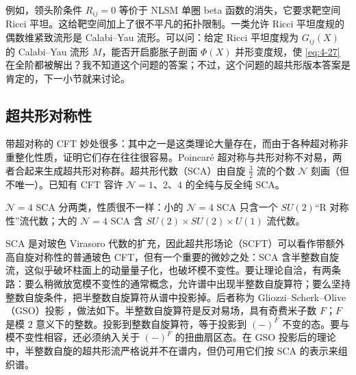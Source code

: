 
例如，领头阶条件 $R_{ij}=0$ 等价于 NLSM 单圈 beta 函数的消失，它要求靶空间 Ricci 平坦。这给靶空间加上了很不平凡的拓扑限制。一类允许 Ricci 平坦度规的偶数维紧致流形是 Calabi--Yau 流形。可以问：给定 Ricci 平坦度规为 $G_{ij}(X)$ 的 Calabi--Yau 流形 $M$，能否开启膨胀子剖面 $\Phi(X)$ 并形变度规，使 \eqref{eq:4-27} 在全阶都被解出？我不知道这个问题的答案；不过，这个问题的超共形版本答案是肯定的，下一小节就来讨论。


\subsection{超共形对称性}

带超对称的 CFT 妙处很多：其中之一是这类理论大量存在，而由于各种超对称非重整化性质，证明它们存在往往很容易。Poincaré 超对称与共形对称不对易，两者合起来生成超共形对称群。超共形代数（SCA）由自旋 $\frac32$ 流的个数 $\mathcal{N}$ 刻画（但不唯一）。已知有 CFT 容许 $\mathcal{N}=1$、$2$、$4$ 的全纯与反全纯 SCA。

$\mathcal{N}=4$ SCA 分两类，性质很不一样：小的 $\mathcal{N}=4$ SCA 只含一个 $SU(2)$“R 对称性”流代数；大的 $\mathcal{N}=4$ SCA 含 $SU(2)\times SU(2)\times U(1)$ 流代数。

SCA 是对玻色 Virasoro 代数的扩充，因此超共形场论（SCFT）可以看作带额外高自旋对称性的普通玻色 CFT，但有一个重要的微妙之处：SCA 含半整数自旋流，这似乎破坏柱面上的动量量子化，也破坏模不变性。要让理论自洽，有两条路：要么稍微放宽模不变性的通常概念，允许谱中出现半整数自旋算符；要么坚持整数自旋条件，把半整数自旋算符从谱中投影掉。后者称为 Gliozzi--Scherk--Olive（GSO）投影 \cite{r26}，做法如下。半整数自旋算符是反对易场，具有奇费米子数 $F$；$F$ 是模 $2$ 意义下的整数。投影到整数自旋算符，等于投影到 $(-)^F$ 不变的态。要与模不变性相容，还必须纳入关于 $(-)^F$ 的扭曲扇区态。在 GSO 投影后的理论中，半整数自旋的超共形流严格说并不在谱内，但仍可用它们按 SCA 的表示来组织谱。

